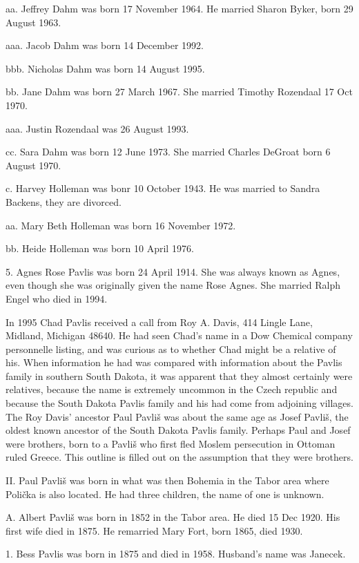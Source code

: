 \documentclass[a4paper]{article}
\begin{document}
aa. Jeffrey Dahm was born 17 November 1964. He married Sharon Byker, born 29 August 1963.

aaa. Jacob Dahm was born 14 December 1992.

bbb. Nicholas Dahm was born 14 August 1995.

bb. Jane Dahm was born 27 March 1967.  She married Timothy Rozendaal 17 Oct 1970. 

aaa. Justin Rozendaal was 26 August 1993.

cc. Sara Dahm was born 12 June 1973.  She married Charles DeGroat born 6 August 1970.

c. Harvey Holleman was bonr 10 October 1943.  He was married to Sandra Backens, they are divorced.

aa. Mary Beth Holleman was born 16 November 1972.

bb. Heide Holleman was born 10 April 1976.

5. Agnes Rose Pavlis was born 24 April 1914.  She was always known as Agnes, even though she was originally given the name Rose Agnes.  She married Ralph Engel who died in 1994.

	In 1995 Chad Pavlis received a call from Roy A. Davis, 414 Lingle Lane, Midland, Michigan 48640.  He had seen Chad's name in a Dow Chemical company personnelle listing, and was curious as to whether Chad might be a relative of his.  When information he had was compared with information about the Pavlis family in southern South Dakota, it was apparent that they almost certainly were relatives, because the name is extremely uncommon in the Czech republic and because the South Dakota Pavlis family and his had come from adjoining villages.  
	The  Roy Davis' ancestor Paul Pavli\v{s} was about the same age as Josef Pavli\v{s}, the oldest known ancestor of the South Dakota Pavlis family.   Perhaps Paul and Josef were brothers, born to a Pavli\v{s} who first fled Moslem persecution in Ottoman ruled Greece.  This outline is filled out on the  assumption that they were brothers. 

II. Paul Pavli\v{s} was born in what was then Bohemia in the Tabor area where Poli\v{c}ka is also located.  He had three children, the name of one is unknown.

A. Albert Pavli\v{s} was born in 1852 in the Tabor area.  He died 15 Dec 1920.  His first wife died in 1875.  He remarried Mary Fort, born 1865, died 1930.  

1. Bess Pavlis was born in 1875 and died in 1958.  Husband's name was Janecek.
\end{document}
